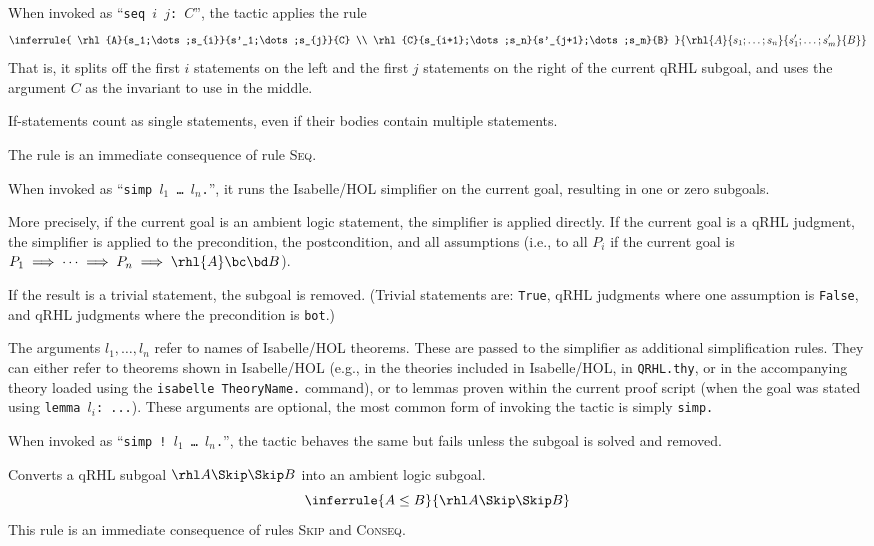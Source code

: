 \documentclass{article}
\renewcommand\ruleref[1]{rule \hbox{\textsc{#1}}}
\renewcommand\rulerefx[1]{\hbox{\textsc{#1}}}
\begin{document}

When invoked as ``\texttt{\frenchspacing seq $i$ $j$: $C$}'', the tactic applies the rule
\[
  \inferrule
  {
    \rhl{A}{s_1;\dots;s_{i}}{s'_1;\dots;s_{j}}{C}
    \\
    \rhl{C}{s_{i+1};\dots;s_n}{s'_{j+1};\dots;s_m}{B}
  }
  {\rhl{A}{s_1;\dots;s_n}{s'_1;\dots;s'_m}{B}}
\]
That is, it splits off the first $i$
statements on the left and the first $j$
statements on the right of the current qRHL subgoal, and uses the
argument $C$ as the invariant to use in the middle.

If-statements count as single statements, even if their bodies contain
multiple statements.

The rule is an immediate consequence of \ruleref{Seq}.


When invoked as ``\texttt{simp $l_1$
  \dots{} $l_n$.}'',
it runs the Isabelle/HOL simplifier on the current goal, resulting in
one or zero subgoals.

More precisely, if the current goal is an ambient logic statement, the
simplifier is applied directly. If the current goal is a qRHL
judgment, the simplifier is applied to the precondition, the
postcondition, and all assumptions (i.e., to all $P_i$
if the current goal is $P_1\implies\dots\implies P_n\implies \rhl{A}\bc\bd B$).

If the result is a trivial statement, the subgoal is removed. (Trivial
statements are: \texttt{True}, qRHL judgments where one assumption is
\texttt{False}, and qRHL judgments where the precondition is
\texttt{bot}.)

The arguments $l_1,\dots,l_n$
refer to names of Isabelle/HOL theorems. These are passed to the
simplifier as additional simplification rules. They can either refer
to theorems shown in Isabelle/HOL (e.g., in the theories included in
Isabelle/HOL, in \texttt{QRHL.thy}, or in the accompanying theory
loaded using the \texttt{isabelle TheoryName.} command), or to lemmas
proven within the current proof script (when the goal was stated using
\texttt{\frenchspacing lemma $l_i$:
  ...}).  These arguments are optional, the most common form of
invoking the tactic is simply \texttt{simp.}


When invoked as ``\texttt{simp ! $l_1$
  \dots{} $l_n$.}'',
the tactic behaves the same but fails unless the subgoal is solved and
removed.



Converts a qRHL subgoal $\rhl A\Skip\Skip B$
into an ambient logic subgoal.
\[
\inferrule{
  A \leq B
}{
  \rhl A \Skip \Skip B
}
\]
This rule is an immediate consequence of rules \rulerefx{Skip} and \rulerefx{Conseq}.
\end{document}
